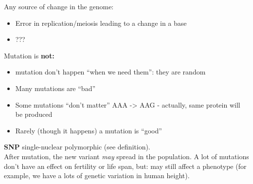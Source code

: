 \documentclass{scrartcl}
\begin{document}
Any source of change in the genome:
\begin{itemize}
\item Error in replication/meiosis leading to a change in a base
\item ???
\end{itemize}

Mutation is {\bf not:}
\begin{itemize}
\item mutation don't happen ``when we need them'': they are random
\item Many mutations are ``bad''
\item Some mutations ``don't matter'' AAA -> AAG - actually, same protein will be produced
\item Rarely (though it happens) a mutation is ``good''
\end{itemize}

{\bf SNP} single-nuclear polymorphic (see definition).\\
After mutation, the new variant {\em may} spread in the population.
A lot of mutations don't have an effect on fertility or life span, but: may still affect a phenotype (for example, we have a lots of genetic variation in human height).

\end{document}
